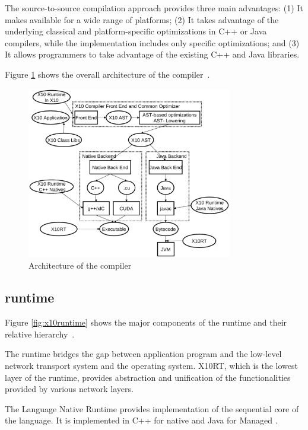 The
source-to-source compilation approach provides 
three main advantages: (1) It makes \xten
available for a wide range of platforms; (2) It takes advantage of the
underlying classical and platform-specific optimizations in C++ or Java
compilers, while the \xten implementation includes only \xten specific
optimizations; and (3) It allows programmers to take advantage of the existing
C++ and Java libraries.

Figure \ref{fig:x10compiler} shows the overall architecture of the \xten
compiler~\cite{x10intro}.  
 
\begin{figure}[p]
    \centering
    \includegraphics[width=0.8\textwidth]{Figures/x10compiler.eps}
    \caption{Architecture of the \xten compiler}
    \label{fig:x10compiler}
\end{figure}

\subsection{\xten runtime}
Figure \ref{fig:x10runtime} shows the major components of the \xten runtime and
their relative hierarchy~\cite{x10intro}. 

The runtime bridges the gap between 
application program and
the low-level network transport system and the operating system. X10RT, which is
the lowest layer of the \xten runtime, provides abstraction and unification of
the functionalities provided by various network layers. 

The \xten Language
Native Runtime provides implementation of the sequential core of the language.
It is implemented in C++ for native \xten and Java for Managed \xten. 

